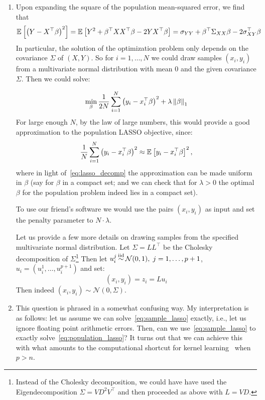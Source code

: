 \begin{enumerate}[label=(\alph*)]

\item  Upon expanding the square of the population mean-squared error, we find that
\footnotesize
\begin{equation}
\label{eq:lasso_decomp}
\mathbb{E}_{}\left[\left(Y - X^\top \beta\right)^2\right] = \mathbb{E}_{}\left[Y^2 + \beta^\top  X X^\top  \beta -2 Y X^\top \beta\right] = \sigma_{YY} + \beta^\top \Sigma_{XX} \beta -2 \sigma_{XY}^\top \beta
\end{equation}
\normalsize
In particular, the solution of the optimization problem only depends on the covariance $\Sigma$ of $(X,Y)$. So for $i=1,\dotsc,N$ we could draw samples $(x_i, y_i)$ from a multivariate normal distribution with mean $0$ and the given covariance $\Sigma$. Then we could solve:

\begin{equation}
\label{eq:sample_lasso}
\min_{\beta} \frac{1}{2 N} \sum_{i=1}^N \left(y_i - x_i^\top \beta\right)^2 + \lambda  \left\lVert\beta\right\rVert_1
\end{equation}
For large enough $N$, by the law of large numbers, this would provide a good approximation to the population LASSO objective, since:
$$  \frac{1}{N} \sum_{i=1}^N \left(y_i - x_i^\top \beta\right)^2 \approx  \mathbb{E}_{}\left[y_i - x_i^\top \beta\right]^2, $$
where in light of~\eqref{eq:lasso_decomp} the approximation can be made uniform in $\beta$ (say for $\beta$ in a compact set; and we can check that for $\lambda > 0$ the optimal $\beta$ for the population problem indeed lies in a compact set). 

To use our friend's software we would use the pairs $(x_i, y_i)$ as input and set the penalty parameter to $N \cdot \lambda$. 

Let us provide a few more details on drawing samples from the specified multivariate normal distribution. Let $\Sigma = LL^\top$ be the Cholesky decomposition of $\Sigma$\footnote{Instead of the Cholesky decomposition, we could have have used the Eigendecomposition $\Sigma = VD^2V^\top$ and then proceeded as above with $L=VD$.} Then let $u_i^j \simiid \mathcal{N}(0, 1),\; j=1,\dotsc,p+1$, $u_i = (u_i^1, \dotsc, u_i^{p+1})$ and set:
$$ (x_i, y_i) = z_i = Lu_i$$
Then indeed $(x_i, y_i) \sim \mathcal{N}(0, \Sigma)$.
\item This question is phrased in a somewhat confusing way. My interpretation is as follows: let us assume we can solve~\eqref{eq:sample_lasso} exactly, i.e., let us ignore floating point arithmetic errors. Then, can we use~\eqref{eq:sample_lasso} to exactly solve~\eqref{eq:population_lasso}? It turns out that we can achieve this with what amounts to the computational shortcut for kernel learning~\citep{hastie2004efficient} when $p>n$.


\end{enumerate}
